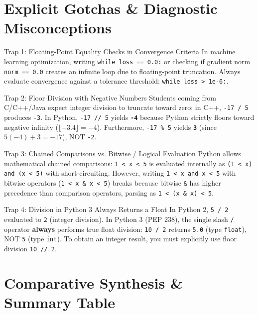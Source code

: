 \section{Explicit Gotchas \& Diagnostic Misconceptions}

\begin{trapbox}{Trap 1: Floating-Point Equality Checks in Convergence Criteria}
In machine learning optimization, writing \texttt{while loss == 0.0:} or checking if gradient norm \texttt{norm == 0.0} creates an infinite loop due to floating-point truncation. Always evaluate convergence against a tolerance threshold: \texttt{while loss > 1e-6:}.
\end{trapbox}

\begin{trapbox}{Trap 2: Floor Division with Negative Numbers}
Students coming from C/C++/Java expect integer division to truncate toward zero: in C++, \texttt{-17 / 5} produces \texttt{-3}. In Python, \texttt{-17 // 5} yields \textbf{\texttt{-4}} because Python strictly floors toward negative infinity ($\lfloor -3.4 \rfloor = -4$). Furthermore, \texttt{-17 \% 5} yields \textbf{\texttt{3}} (since $5(-4) + 3 = -17$), NOT \texttt{-2}.
\end{trapbox}

\begin{trapbox}{Trap 3: Chained Comparisons vs. Bitwise / Logical Evaluation}
Python allows mathematical chained comparisons: \texttt{1 < x < 5} is evaluated internally as \texttt{(1 < x) and (x < 5)} with short-circuiting. However, writing \texttt{1 < x and x < 5} with bitwise operators (\texttt{1 < x \& x < 5}) breaks because bitwise \texttt{\&} has higher precedence than comparison operators, parsing as \texttt{1 < (x \& x) < 5}.
\end{trapbox}

\begin{trapbox}{Trap 4: Division in Python 3 Always Returns a Float}
In Python 2, \texttt{5 / 2} evaluated to \texttt{2} (integer division). In Python 3 (PEP 238), the single slash \texttt{/} operator \textbf{always} performs true float division: \texttt{10 / 2} returns \texttt{5.0} (type \texttt{float}), NOT \texttt{5} (type \texttt{int}). To obtain an integer result, you must explicitly use floor division \texttt{10 // 2}.
\end{trapbox}

\section{Comparative Synthesis \& Summary Table}

